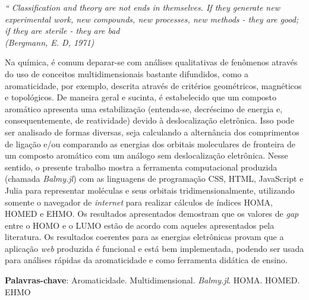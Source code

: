 \begin{epigrafe}
	\vspace*{\fill}
	\begin{flushright}
		\textit{``
		Classification and theory are not ends in themselves. If they generate new experimental work, new compounds, new processes, new methods - they are good;
		if they are sterile - they are bad  \\
		(Bergmann, E. D, 1971)}
	\end{flushright}
\end{epigrafe}


\setlength{\absparsep}{18pt} %
\begin{resumo}
	\SingleSpacing
    Na química, é comum deparar-se com análises qualitativas de fenômenos através do uso de conceitos multidimensionais bastante difundidos, como a aromaticidade, por exemplo, descrita através de critérios geométricos, magnéticos e topológicos. De maneira geral e sucinta, é estabelecido que um composto aromático apresenta uma estabilização (entenda-se, decréscimo de energia e, consequentemente, de reatividade) devido à deslocalização eletrônica. Isso pode ser analisado de formas diversas, seja calculando a alternância dos comprimentos de ligação e/ou comparando as energias dos orbitais moleculares de fronteira de um composto aromático com um análogo sem deslocalização eletrônica. Nesse sentido, o presente trabalho mostra a ferramenta computacional produzida (chamada \textit{Balmy.jl}) com as linguagens de programação \gls{CSS}, \gls{HTML}, JavaScript e Julia para representar moléculas e seus orbitais tridimensionalmente, utilizando somente o navegador de \textit{internet} para realizar cálculos de índices \gls{HOMA}, \gls{HOMED} e \gls{EHMO}. Os resultados apresentados demostram que os valores de \textit{gap} entre o \gls{HOMO} e o \gls{LUMO} estão de acordo com aqueles apresentados pela literatura. Os resultados coerentes para as energias eletrônicas provam que a aplicação \textit{web} produzida é funcional e está bem implementada, podendo ser usada para análises rápidas da aromaticidade e como ferramenta didática de ensino.
	
	\textbf{Palavras-chave}: Aromaticidade. Multidimensional. \textit{Balmy.jl}. \gls{HOMA}. \gls{HOMED}. \gls{EHMO}
\end{resumo}

